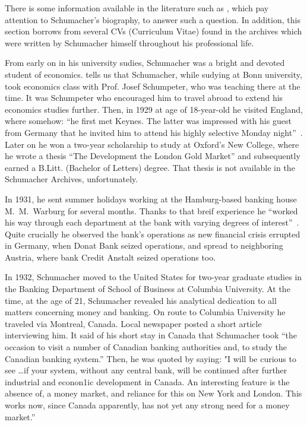 There is some information available in the literature such as \citep{wood1984,hession1986,toye2012,leonard2018,leonard2022}, which pay attention to Schumacher's biography, to answer such a question. In addition, this section borrows from several CVs (Curriculum Vitae) found in the archives which were written by Schumacher himself throughout his professional life. 

From early on in his university sudies, Schumacher was a bright and devoted student of economics. \cite{hession1986} tells us that Schumacher, while sudying at Bonn university, took economics class with Prof. Josef Schumpeter, who was teaching there at the time. It was Schumpeter who encouraged him to travel abroad to extend his economics studies further. Then, in 1929 at age of 18-year-old he visited England, where somehow: ``he first met Keynes. The latter was impressed with his guest from Germany that he invited him to attend his highly selective Monday night''~\citep[p.~2]{hession1986}. Later on he won a two-year scholarship to study at Oxford's New College, where he wrote a thesis ``The Development the London Gold Market'' and subsequently earned a B.Litt. (Bachelor of Letters) degree. That thesis is not available in the Schumacher Archives, unfortunately. 

In 1931, he sent summer holidays working at the Hamburg-based banking house M.~M.~Warburg for several months. Thanks to that breif experience he ``worked his way through each department at the bank with varying degrees of interest''~\cite[p.~36]{wood1984}. Quite crucially he observed the bank's operations as new financial crisis errupted in Germany, when Donat Bank seized operations, and spread to neighboring Austria, where bank Credit Anstalt seized operations too. 

In 1932, Schumacher moved to the United States for two-year graduate studies in the Banking Department of School of Business at Columbia University. At the time, at the age of 21, Schumacher revealed his analytical dedication to all matters concerning money and banking. On route to Columbia University he traveled via Montreal, Canada. Local newspaper posted a short article interviewing him. It said of his short stay in Canada that Schumacher took ``the occasion to visit a number of Canadian banking authorities and, to study the Canadian banking system.'' Then, he was quoted by saying: "I will be curious to see \dots if your system, without any central bank, will be continued after further industrial and econon1ic development in Canada. An interesting feature is the absence of, a money market, and reliance for this on New York and London. This works now, since Canada apparently, has not yet any strong need for a money market.''~\citep{schumacher1932}

